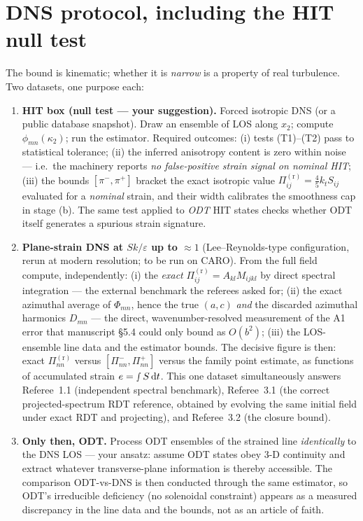\documentclass[11pt,a4paper]{article}
\newcommand{\Pir}[1]{\Pi^{(\mathrm r)}_{#1}}
\newcommand{\dd}{\mathrm{d}}
\begin{document}
\section{DNS protocol, including the HIT null test}
\label{sec:protocol}

The bound is kinematic; whether it is \emph{narrow} is a property of real
turbulence. Two datasets, one purpose each:

\begin{enumerate}[leftmargin=2em]
\item \textbf{HIT box (null test --- your suggestion).} Forced isotropic DNS
  (or a public database snapshot). Draw an ensemble of LOS along $x_2$;
  compute $\phi_{mn}(\kappa_2)$; run the estimator. Required outcomes:
  (i) tests (T1)--(T2) pass to statistical tolerance; (ii) the inferred
  anisotropy content is zero within noise --- i.e.\ the machinery reports
  \emph{no false-positive strain signal on nominal HIT}; (iii) the bounds
  $[\pi^-,\pi^+]$ bracket the exact isotropic value
  $\Pir{ij}=\tfrac45 k_t S_{ij}$ evaluated for a \emph{nominal} strain, and
  their width calibrates the smoothness cap in stage (b). The same test
  applied to \emph{ODT} HIT states checks whether ODT itself generates a
  spurious strain signature.
\item \textbf{Plane-strain DNS at $Sk/\varepsilon$ up to $\approx1$}
  (Lee--Reynolds-type configuration, rerun at modern resolution; to be run on
  CARO). From the full field compute, independently:
  (i) the \emph{exact} $\Pir{ij}=A_{kl}M_{ijkl}$ by direct spectral
  integration --- the external benchmark the referees asked for;
  (ii) the exact azimuthal average of $\Phi_{mn}$, hence the true
  $(a,c)$ \emph{and} the discarded azimuthal harmonics $D_{mn}$
  --- the direct, wavenumber-resolved measurement of the A1 error that
  manuscript \S5.4 could only bound as $O(b^2)$;
  (iii) the LOS-ensemble line data and the estimator bounds.
  The decisive figure is then: exact $\Pir{nn}$ versus $[\Pi^-_{nn},\Pi^+_{nn}]$
  versus the family point estimate, as functions of accumulated strain
  $e=\smallint S\,\dd t$. This one dataset simultaneously answers
  Referee~1.1 (independent spectral benchmark), Referee~3.1 (the correct
  projected-spectrum RDT reference, obtained by evolving the same initial
  field under exact RDT and projecting), and Referee~3.2 (the closure bound).
\item \textbf{Only then, ODT.} Process ODT ensembles of the strained line
  \emph{identically} to the DNS LOS --- your ansatz: assume ODT states obey
  3-D continuity and extract whatever transverse-plane information is
  thereby accessible. The comparison ODT-vs-DNS is then conducted through the
  same estimator, so ODT's irreducible deficiency (no solenoidal constraint)
  appears as a measured discrepancy in the line data and the bounds, not as an
  article of faith.
\end{enumerate}
\end{document}

